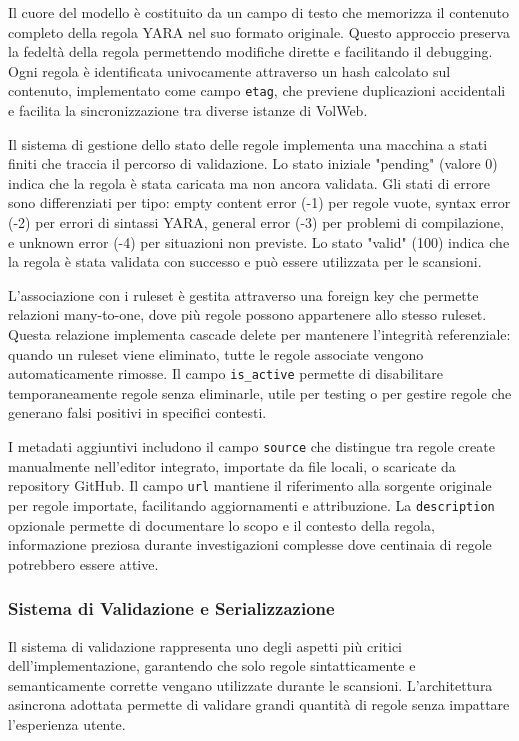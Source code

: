 Il cuore del modello è costituito da un campo di testo che memorizza il contenuto completo della regola YARA nel suo formato originale. Questo approccio preserva la fedeltà della regola permettendo modifiche dirette e facilitando il debugging. Ogni regola è identificata univocamente attraverso un hash calcolato sul contenuto, implementato come campo \texttt{etag}, che previene duplicazioni accidentali e facilita la sincronizzazione tra diverse istanze di VolWeb.

Il sistema di gestione dello stato delle regole implementa una macchina a stati finiti che traccia il percorso di validazione. Lo stato iniziale "pending" (valore 0) indica che la regola è stata caricata ma non ancora validata. Gli stati di errore sono differenziati per tipo: empty content error (-1) per regole vuote, syntax error (-2) per errori di sintassi YARA, general error (-3) per problemi di compilazione, e unknown error (-4) per situazioni non previste. Lo stato "valid" (100) indica che la regola è stata validata con successo e può essere utilizzata per le scansioni.

L'associazione con i ruleset è gestita attraverso una foreign key che permette relazioni many-to-one, dove più regole possono appartenere allo stesso ruleset. Questa relazione implementa cascade delete per mantenere l'integrità referenziale: quando un ruleset viene eliminato, tutte le regole associate vengono automaticamente rimosse. Il campo \texttt{is\_active} permette di disabilitare temporaneamente regole senza eliminarle, utile per testing o per gestire regole che generano falsi positivi in specifici contesti.

I metadati aggiuntivi includono il campo \texttt{source} che distingue tra regole create manualmente nell'editor integrato, importate da file locali, o scaricate da repository GitHub. Il campo \texttt{url} mantiene il riferimento alla sorgente originale per regole importate, facilitando aggiornamenti e attribuzione. La \texttt{description} opzionale permette di documentare lo scopo e il contesto della regola, informazione preziosa durante investigazioni complesse dove centinaia di regole potrebbero essere attive.

\subsubsection{Sistema di Validazione e Serializzazione}

Il sistema di validazione rappresenta uno degli aspetti più critici dell'implementazione, garantendo che solo regole sintatticamente e semanticamente corrette vengano utilizzate durante le scansioni. L'architettura asincrona adottata permette di validare grandi quantità di regole senza impattare l'esperienza utente.

